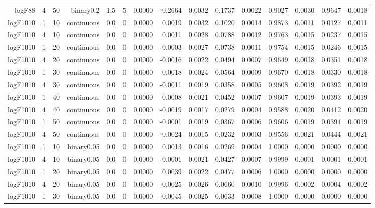 \begin{longtable}{rrrrrrrrrrrrrrr}
  logF88 & 4 & 50 & binary0.2 & 1.5 & 5 & 0.0000 & -0.2664 & 0.0032 & 0.1737 & 0.0022 & 0.9027 & 0.0030 & 0.9647 & 0.0018 \\ 
  logF1010 & 1 & 10 & continuous & 0.0 & 0 & 0.0000 & 0.0019 & 0.0032 & 0.1020 & 0.0014 & 0.9873 & 0.0011 & 0.0127 & 0.0011 \\ 
  logF1010 & 4 & 10 & continuous & 0.0 & 0 & 0.0000 & 0.0011 & 0.0028 & 0.0788 & 0.0012 & 0.9763 & 0.0015 & 0.0237 & 0.0015 \\ 
  logF1010 & 1 & 20 & continuous & 0.0 & 0 & 0.0000 & -0.0003 & 0.0027 & 0.0738 & 0.0011 & 0.9754 & 0.0015 & 0.0246 & 0.0015 \\ 
  logF1010 & 4 & 20 & continuous & 0.0 & 0 & 0.0000 & -0.0016 & 0.0022 & 0.0494 & 0.0007 & 0.9649 & 0.0018 & 0.0351 & 0.0018 \\ 
  logF1010 & 1 & 30 & continuous & 0.0 & 0 & 0.0000 & 0.0018 & 0.0024 & 0.0564 & 0.0009 & 0.9670 & 0.0018 & 0.0330 & 0.0018 \\ 
  logF1010 & 4 & 30 & continuous & 0.0 & 0 & 0.0000 & -0.0011 & 0.0019 & 0.0358 & 0.0005 & 0.9608 & 0.0019 & 0.0392 & 0.0019 \\ 
  logF1010 & 1 & 40 & continuous & 0.0 & 0 & 0.0000 & 0.0008 & 0.0021 & 0.0452 & 0.0007 & 0.9607 & 0.0019 & 0.0393 & 0.0019 \\ 
  logF1010 & 4 & 40 & continuous & 0.0 & 0 & 0.0000 & -0.0019 & 0.0017 & 0.0279 & 0.0004 & 0.9588 & 0.0020 & 0.0412 & 0.0020 \\ 
  logF1010 & 1 & 50 & continuous & 0.0 & 0 & 0.0000 & -0.0001 & 0.0019 & 0.0367 & 0.0006 & 0.9606 & 0.0019 & 0.0394 & 0.0019 \\ 
  logF1010 & 4 & 50 & continuous & 0.0 & 0 & 0.0000 & -0.0024 & 0.0015 & 0.0232 & 0.0003 & 0.9556 & 0.0021 & 0.0444 & 0.0021 \\ 
  logF1010 & 1 & 10 & binary0.05 & 0.0 & 0 & 0.0000 & 0.0013 & 0.0016 & 0.0269 & 0.0004 & 1.0000 & 0.0000 & 0.0000 & 0.0000 \\ 
  logF1010 & 4 & 10 & binary0.05 & 0.0 & 0 & 0.0000 & -0.0001 & 0.0021 & 0.0427 & 0.0007 & 0.9999 & 0.0001 & 0.0001 & 0.0001 \\ 
  logF1010 & 1 & 20 & binary0.05 & 0.0 & 0 & 0.0000 & 0.0039 & 0.0022 & 0.0477 & 0.0006 & 1.0000 & 0.0000 & 0.0000 & 0.0000 \\ 
  logF1010 & 4 & 20 & binary0.05 & 0.0 & 0 & 0.0000 & -0.0025 & 0.0026 & 0.0660 & 0.0010 & 0.9996 & 0.0002 & 0.0004 & 0.0002 \\ 
  logF1010 & 1 & 30 & binary0.05 & 0.0 & 0 & 0.0000 & -0.0045 & 0.0025 & 0.0633 & 0.0008 & 1.0000 & 0.0000 & 0.0000 & 0.0000 \\ 

\end{longtable}

